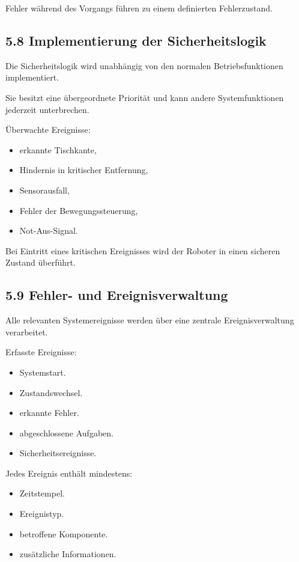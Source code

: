 \documentclass[
]{article}
\providecommand{\tightlist}{%
  \setlength{\itemsep}{0pt}\setlength{\parskip}{0pt}}
\begin{document}
Fehler während des Vorgangs führen zu einem definierten Fehlerzustand.

\subsection{5.8 Implementierung der
Sicherheitslogik}\label{implementierung-der-sicherheitslogik}

Die Sicherheitslogik wird unabhängig von den normalen Betriebsfunktionen
implementiert.

Sie besitzt eine übergeordnete Priorität und kann andere
Systemfunktionen jederzeit unterbrechen.

Überwachte Ereignisse:

\begin{itemize}
\tightlist
\item
  erkannte Tischkante,
\item
  Hindernis in kritischer Entfernung,
\item
  Sensorausfall,
\item
  Fehler der Bewegungssteuerung,
\item
  Not-Aus-Signal.
\end{itemize}

Bei Eintritt eines kritischen Ereignisses wird der Roboter in einen
sicheren Zustand überführt.

\subsection{5.9 Fehler- und
Ereignisverwaltung}\label{fehler--und-ereignisverwaltung}

Alle relevanten Systemereignisse werden über eine zentrale
Ereignisverwaltung verarbeitet.

Erfasste Ereignisse:

\begin{itemize}
\tightlist
\item
  Systemstart.
\item
  Zustandswechsel.
\item
  erkannte Fehler.
\item
  abgeschlossene Aufgaben.
\item
  Sicherheitsereignisse.
\end{itemize}

Jedes Ereignis enthält mindestens:

\begin{itemize}
\tightlist
\item
  Zeitstempel.
\item
  Ereignistyp.
\item
  betroffene Komponente.
\item
  zusätzliche Informationen.
\end{itemize}
\end{document}
